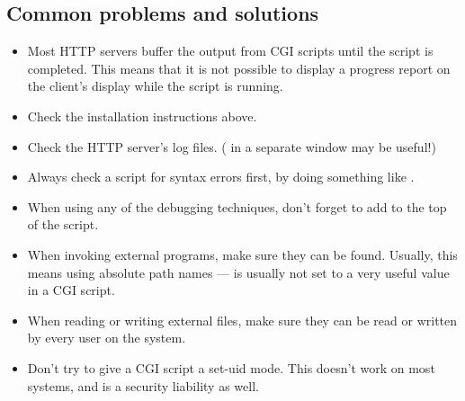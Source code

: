 \subsection{Common problems and solutions}

\begin{itemize}
\item Most HTTP servers buffer the output from CGI scripts until the
script is completed.  This means that it is not possible to display a
progress report on the client's display while the script is running.

\item Check the installation instructions above.

\item Check the HTTP server's log files.  ( in a
separate window may be useful!)

\item Always check a script for syntax errors first, by doing something
like .

\item When using any of the debugging techniques, don't forget to add
 to the top of the script.

\item When invoking external programs, make sure they can be found.
Usually, this means using absolute path names ---  is
usually not set to a very useful value in a CGI script.

\item When reading or writing external files, make sure they can be read
or written by every user on the system.

\item Don't try to give a CGI script a set-uid mode.  This doesn't work on
most systems, and is a security liability as well.
\end{itemize}

